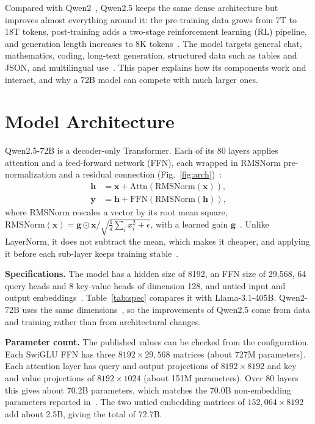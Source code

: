 \documentclass[conference]{IEEEtran}
\begin{document}
Compared with Qwen2~\cite{qwen2}, Qwen2.5 keeps the same dense architecture but improves almost everything around it: the pre-training data grows from 7T to 18T tokens, post-training adds a two-stage reinforcement learning (RL) pipeline, and generation length increases to 8K tokens~\cite{qwen25}. The model targets general chat, mathematics, coding, long-text generation, structured data such as tables and JSON, and multilingual use~\cite{qwen25}. This paper explains how its components work and interact, and why a 72B model can compete with much larger ones.

\section{Model Architecture}
Qwen2.5-72B is a decoder-only Transformer. Each of its 80 layers applies attention and a feed-forward network (FFN), each wrapped in RMSNorm pre-normalization and a residual connection (Fig.~\ref{fig:arch})~\cite{qwen25}:
\begin{align}
\mathbf{h}&=\mathbf{x}+\mathrm{Attn}\!\left(\mathrm{RMSNorm}(\mathbf{x})\right),\\
\mathbf{y}&=\mathbf{h}+\mathrm{FFN}\!\left(\mathrm{RMSNorm}(\mathbf{h})\right),
\end{align}
where RMSNorm rescales a vector by its root mean square, $\mathrm{RMSNorm}(\mathbf{x})=\mathbf{g}\odot\mathbf{x}/\sqrt{\tfrac{1}{d}\sum_i x_i^2+\epsilon}$, with a learned gain $\mathbf{g}$~\cite{rmsnorm}. Unlike LayerNorm, it does not subtract the mean, which makes it cheaper, and applying it before each sub-layer keeps training stable~\cite{qwen25}.

\textbf{Specifications.} The model has a hidden size of 8192, an FFN size of 29{,}568, 64 query heads and 8 key-value heads of dimension 128, and untied input and output embeddings~\cite{qwen2,qwen25card}. Table~\ref{tab:spec} compares it with Llama-3.1-405B. Qwen2-72B uses the same dimensions~\cite{qwen2}, so the improvements of Qwen2.5 come from data and training rather than from architectural changes.

\textbf{Parameter count.} The published values can be checked from the configuration. Each SwiGLU FFN has three $8192\times29{,}568$ matrices (about 727M parameters). Each attention layer has query and output projections of $8192\times8192$ and key and value projections of $8192\times1024$ (about 151M parameters). Over 80 layers this gives about 70.2B parameters, which matches the 70.0B non-embedding parameters reported in~\cite{qwen25card}. The two untied embedding matrices of $152{,}064\times8192$ add about 2.5B, giving the total of 72.7B.
\end{document}
